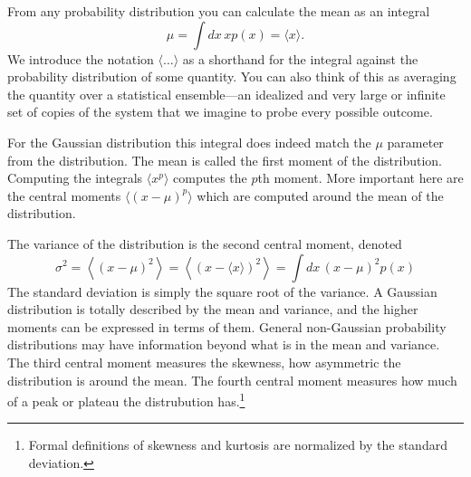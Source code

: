 From any probability distribution you can calculate the mean as an integral
\begin{equation}
  \mu = \int dx\,  x  p(x) = \langle x \rangle.
\end{equation}
We introduce the notation $\langle \dots \rangle$ as a shorthand for the integral against the probability distribution of some quantity.  You can also think of this as averaging the quantity over a statistical ensemble---an idealized and very large or infinite set of copies of the system that we imagine to probe every possible outcome.

For the Gaussian distribution this integral does indeed match the $\mu$ parameter from the distribution.  The mean is called the first moment of the distribution.  Computing the integrals $\langle x^p \rangle$ computes the $p$th moment.  More important here are the central moments $\langle (x-\mu)^p \rangle$ which are computed around the mean of the distribution.

The variance of the distribution is the second central moment, denoted
\begin{equation}
  \sigma^2 = \left\langle (x - \mu)^2 \right\rangle = \left\langle (x - \langle x \rangle)^2 \right\rangle =  \int dx\,  (x-\mu)^2  p(x) 
\end{equation}
The standard deviation is simply the square root of the variance.  A Gaussian distribution is totally described by the mean and variance, and the higher moments can be expressed in terms of them.  General non-Gaussian probability distributions may have information beyond what is in the mean and variance.   The third central moment measures the skewness, how asymmetric the distribution is around the mean.  The fourth central moment measures how much of a peak or plateau the distrubution has.\footnote{Formal definitions of skewness and kurtosis are normalized by the standard deviation.}  

